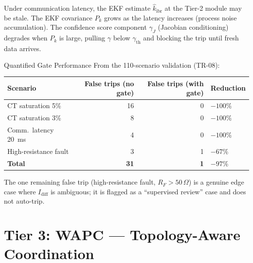 \documentclass[12pt,a4paper]{article}
\newcommand{\kibrhat}{\hat{k}_\mathrm{ibr}}
\newcommand{\Idiff}{I_\mathrm{diff}}
\newcommand{\gammath}{\gamma_\mathrm{th}}
\begin{document}
Under communication latency, the EKF estimate $\kibrhat$ at the Tier-2
module may be stale.  The EKF covariance $P_k$ grows as the latency
increases (process noise accumulation).  The confidence score component
$\gamma_J$ (Jacobian conditioning) degrades when $P_k$ is large, pulling
$\gamma$ below $\gammath$ and blocking the trip until fresh data arrives.

\begin{resultbox}{Quantified Gate Performance}
From the 110-scenario validation (TR-08):
\begin{center}
\small
\begin{tabular}{@{}lrrl@{}}
\toprule
\textbf{Scenario} & \textbf{False trips (no gate)} & \textbf{False trips (with gate)} & \textbf{Reduction} \\
\midrule
CT saturation 5\% & 16 & 0 & $-100\%$ \\
CT saturation 3\% & 8  & 0 & $-100\%$ \\
Comm.\ latency 20~ms & 4 & 0 & $-100\%$ \\
High-resistance fault & 3 & 1 & $-67\%$ \\
\midrule
\textbf{Total} & \textbf{31} & \textbf{1} & \textbf{$-97\%$} \\
\bottomrule
\end{tabular}
\end{center}
The one remaining false trip (high-resistance fault, $R_F > 50\,\Omega$)
is a genuine edge case where $\Idiff$ is ambiguous; it is flagged as a
``supervised review'' case and does not auto-trip.
\end{resultbox}

\section{Tier 3: WAPC --- Topology-Aware Coordination}
\end{document}
